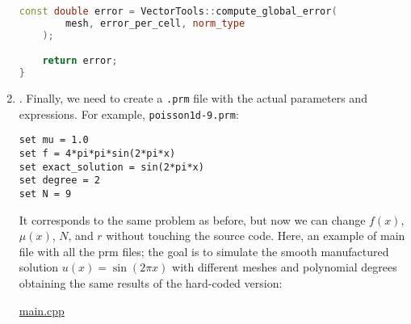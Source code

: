 \begin{enumerate}
\begin{lstlisting}[language=C++]
    const double error = VectorTools::compute_global_error(
        mesh, error_per_cell, norm_type
    );

    return error;
}\end{lstlisting}


    \item {}. Finally, we need to create a \texttt{.prm} file with the actual parameters and expressions. For example, \texttt{poisson1d-9.prm}:
    \begin{lstlisting}[language=prm]
set mu = 1.0
set f = 4*pi*pi*sin(2*pi*x)
set exact_solution = sin(2*pi*x)
set degree = 2
set N = 9\end{lstlisting}
    It corresponds to the same problem as before, but now we can change $f(x)$, $\mu(x)$, $N$, and $r$ without touching the source code. Here, an example of main file with all the prm files; the goal is to simulate the smooth manufactured solution $u(x) = \sin(2\pi x)$ with different meshes and polynomial degrees obtaining the same results of the hard-coded version:
    \begin{center}
        \href{https://gist.github.com/AndreVale69/53f6ebdecb3a6aba218c28a74c50d5c8}{ main.cpp} \hspace{1em} 
    \end{center}
\end{enumerate}

\newpage


